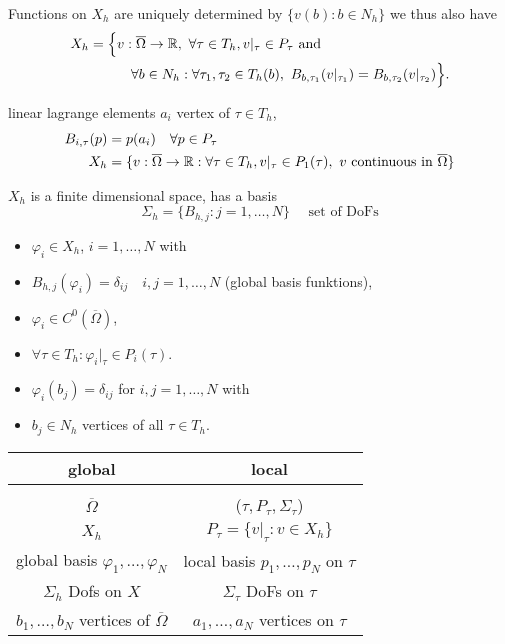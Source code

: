 Functions on $X_h$ are uniquely determined by $\{v(b): b \in N_h \}$ we thus also have 
\begin{align*}
	X_h = \Big \{& v: \overline{\Omega} \to \mathbb{R},\ \forall \tau \in T_h, v|_\tau \in P_\tau \text{ and }\\ &{} \quad \forall b \in N_h: \forall \tau_1,\tau_2 \in T_h(b) ,\ B_{b,\tau_1}(v|_{\tau_1}) = B_{b,\tau_2}(v|_{\tau_2})  \Big\}.
\end{align*}

\begin{example}
	linear lagrange elements $a_i$ vertex of $\tau \in T_h$,
	\begin{align*}
		B_{i,\tau}(p)  &= p(a_i) \quad \forall p \in P_\tau \\
		X_h &= \{ v:\overline{\Omega} \to \mathbb{R} : \forall \tau \in T_h, v|_{\tau} \in P_1(\tau) ,\ v \text{ continuous in } \overline{\Omega} \}
	\end{align*}
\end{example}

$X_h$ is a finite dimensional space, has a basis
\begin{equation*}
	\Sigma_h = \{ B_{h,j} : j= 1,\dots,N  \} \quad \text{ set of DoFs} 
\end{equation*}

\begin{itemize}
	\item $\varphi_i \in X_h$, $ i=1,\dots,N$ with
	\item  $B_{h,j}(\varphi_i) = \delta_{ij} \quad i,j=1,\dots,N$ (global basis funktions),
	\item $\varphi_i \in C^0(\overline{\Omega})$,
	\item  $\forall \tau \in T_h: \varphi_i|_\tau \in P_i(\tau)$.
	\item $\varphi_i(b_j) = \delta_{ij}$ for $i,j = 1,\dots,N$ with 
	\item $b_j \in N_h$ vertices of all $\tau \in T_h$.
\end{itemize}


\centering
\begin{tabular}{c|c}
	global  & local \\ \hline 
	&\\
	$\overline{\Omega} $&  ($\tau , P_\tau, \Sigma_\tau$) \\
	$X_h$ & $P_\tau = \{ v|_\tau :v \in X_h  \}$ \\
	global basis $\varphi_1,\dots,\varphi_N$ & local basis $p_1,\dots,p_N$ on $\tau$\\
	$\Sigma_h$ Dofs on $X$ & $\Sigma_\tau$ DoFs on $\tau$\\
	$b_1,\dots,b_N$ vertices of $\overline{\Omega}$ & $a_1,\dots,a_N$ vertices on $\tau$		
\end{tabular}

